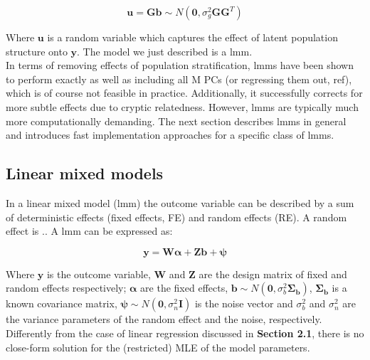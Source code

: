 \begin{equation}
    \mathbf{u} =  \mathbf{G}\mathbf{b} \sim N(\mathbf{0},\sigma^2_g \mathbf{G}\mathbf{G}^T)
\end{equation}

Where $\mathbf{u}$ is a random variable which captures the effect of latent population structure onto $\mathbf{y}$.
The model we just described is a \gls{lmm}.\\

In terms of removing effects of population stratification, \gls{lmm}s have been shown to perform exactly as well as  including all M PCs (or regressing them out, ref), which is of course not feasible in practice.
Additionally, it successfully corrects for more subtle effects due to cryptic relatedness.
However, \gls{lmm}s are typically much more computationally demanding.
The next section describes \gls{lmm}s in general and introduces fast implementation approaches for a specific class of \gls{lmm}s.

\subsection{Linear mixed models}

In a linear mixed model (\gls{lmm}) the outcome variable can be described by a sum of deterministic effects (fixed effects, FE) and random effects (RE).
A random effect is ..
A \gls{lmm} can be expressed as:

\begin{equation}\label{eq:Linear_mixed_model}
 \mathbf{y} =  \mathbf{W}\boldsymbol{\alpha} + \mathbf{Z}\mathbf{b} + \boldsymbol{\psi} 
\end{equation}

Where $\mathbf{y}$ is the outcome variable, $\mathbf{W}$ and $\mathbf{Z}$ are the design matrix of fixed and random effects respectively; $\boldsymbol{\alpha}$ are the fixed effects, $\mathbf{b} \sim N(\mathbf{0},\sigma_b^2\boldsymbol{\Sigma_b})$, $\boldsymbol{\Sigma_b}$ is a known covariance matrix, $\boldsymbol{\psi} \sim N(\mathbf{0},\sigma_n^2\mathbf{I})$ is the noise vector and $\sigma_b^2$ and $\sigma_n^2$ are the variance parameters of the random effect and the noise, respectively.\\

Differently from the case of linear regression discussed in \textbf{Section 2.1}, there is no close-form solution for the (restricted) MLE of the model parameters. \\

